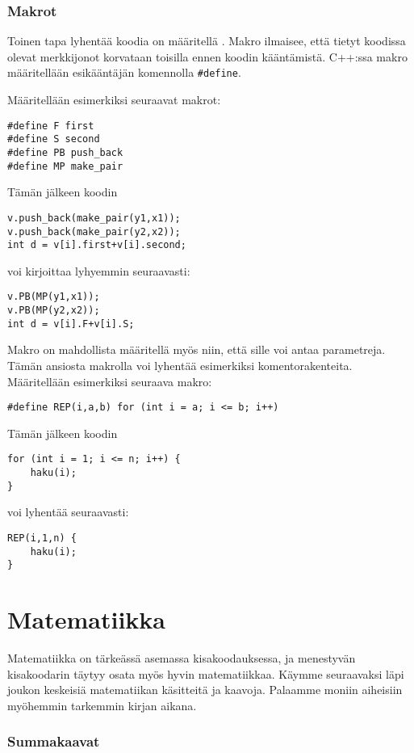 \subsubsection{Makrot}
Toinen tapa lyhentää koodia on määritellä .
Makro ilmaisee, että tietyt koodissa olevat
merkkijonot korvataan toisilla ennen koodin
kääntämistä.
C++:ssa makro määritellään
esikääntäjän komennolla \texttt{\#define}.

Määritellään esimerkiksi seuraavat makrot:
\begin{lstlisting}
#define F first
#define S second
#define PB push_back
#define MP make_pair
\end{lstlisting}
Tämän jälkeen koodin
\begin{lstlisting}
v.push_back(make_pair(y1,x1));
v.push_back(make_pair(y2,x2));
int d = v[i].first+v[i].second;
\end{lstlisting}
voi kirjoittaa lyhyemmin seuraavasti:
\begin{lstlisting}
v.PB(MP(y1,x1));
v.PB(MP(y2,x2));
int d = v[i].F+v[i].S;
\end{lstlisting}

Makro on mahdollista määritellä myös niin,
että sille voi antaa parametreja.
Tämän ansiosta makrolla voi lyhentää esimerkiksi
komentorakenteita.
Määritellään esimerkiksi seuraava makro:
\begin{lstlisting}
#define REP(i,a,b) for (int i = a; i <= b; i++)
\end{lstlisting}
Tämän jälkeen koodin
\begin{lstlisting}
for (int i = 1; i <= n; i++) {
    haku(i);
}
\end{lstlisting}
voi lyhentää seuraavasti:
\begin{lstlisting}
REP(i,1,n) {
    haku(i);
}
\end{lstlisting}

\section{Matematiikka}

Matematiikka on tärkeässä asemassa kisakoodauksessa,
ja menestyvän kisakoodarin täytyy osata myös
hyvin matematiikkaa.
Käymme seuraavaksi läpi joukon keskeisiä
matematiikan käsitteitä ja kaavoja.
Palaamme moniin aiheisiin myöhemmin tarkemmin kirjan aikana.

\subsubsection{Summakaavat}


